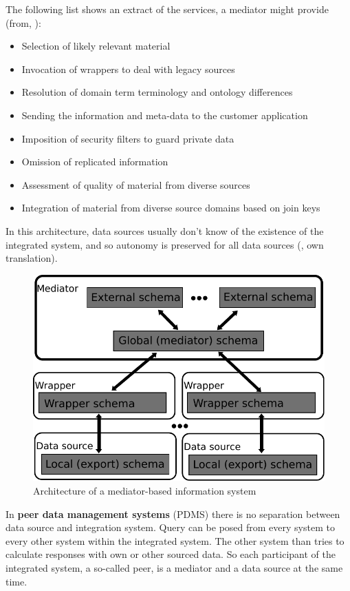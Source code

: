The following list shows an extract of the services, a mediator might provide (from, \cite[p. 5-6]{Wiederhold1996TheCB}): 
\begin{itemize}
\item Selection of likely relevant material
\item Invocation of wrappers to deal with legacy sources
\item Resolution of domain term	terminology and ontology differences
\item Sending the information and meta-data to the customer application
\item Imposition of security filters to guard private data
\item Omission of replicated information
\item Assessment of quality of material from diverse sources
\item Integration of material from diverse source domains based on join keys
\end{itemize}

In this architecture, data sources usually don't know of the existence of the integrated system, and so autonomy is preserved for all data sources (\cite[p. 97]{DBLP:books/dp/LeserN2006}, own translation).
\begin{figure}[H]
	\begin{center}
		\includegraphics[scale=0.5]{figures/MediatorBasedArchitecture.pdf}
	\end{center}
	\caption{Architecture of a  mediator-based information system}
	\label{MediatorBasedArchitecture}
\end{figure}
In \textbf{peer data management systems} (PDMS) there is no separation between data source and integration system. Query can be posed from every system to every other system within the integrated system. The other system than tries to calculate responses with own or other sourced data. So each participant of the integrated system, a so-called peer, is a mediator and a data source at the same time.  

